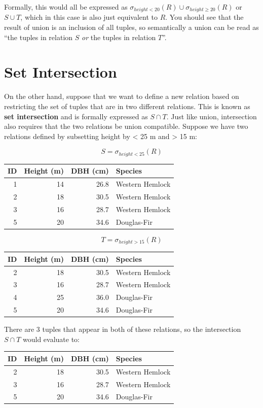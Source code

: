 \documentclass[
]{book}
\begin{document}
Formally, this would all be expressed as \(σ_{height<20}(R)∪σ_{height≥20}(R)\) or \(S∪T\), which in this case is also just equivalent to \(R\). You should see that the result of union is an inclusion of all tuples, so semantically a union can be read as ``the tuples in relation \(S\) \emph{or} the tuples in relation \(T\)''.

\hypertarget{set-intersection}{%
\section{Set Intersection}\label{set-intersection}}

On the other hand, suppose that we want to define a new relation based on restricting the set of tuples that are in two different relations. This is known as \textbf{set intersection} and is formally expressed as \(S∩T\). Just like union, intersection also requires that the two relations be union compatible. Suppose we have two relations defined by subsetting height by \textless{} 25 m and \textgreater{} 15 m:

\[S = σ_{height<25}(R)\]

\begin{tabular}{rrrl}
\toprule
ID & Height (m) & DBH (cm) & Species\\
\midrule
1 & 14 & 26.8 & Western Hemlock\\
2 & 18 & 30.5 & Western Hemlock\\
3 & 16 & 28.7 & Western Hemlock\\
5 & 20 & 34.6 & Douglas-Fir\\
\bottomrule
\end{tabular}

\[T = σ_{height>15}(R)\]

\begin{tabular}{rrrl}
\toprule
ID & Height (m) & DBH (cm) & Species\\
\midrule
2 & 18 & 30.5 & Western Hemlock\\
3 & 16 & 28.7 & Western Hemlock\\
4 & 25 & 36.0 & Douglas-Fir\\
5 & 20 & 34.6 & Douglas-Fir\\
\bottomrule
\end{tabular}

There are 3 tuples that appear in both of these relations, so the intersection \(S∩T\) would evaluate to:

\begin{tabular}{rrrl}
\toprule
ID & Height (m) & DBH (cm) & Species\\
\midrule
2 & 18 & 30.5 & Western Hemlock\\
3 & 16 & 28.7 & Western Hemlock\\
5 & 20 & 34.6 & Douglas-Fir\\
\bottomrule
\end{tabular}
\end{document}
